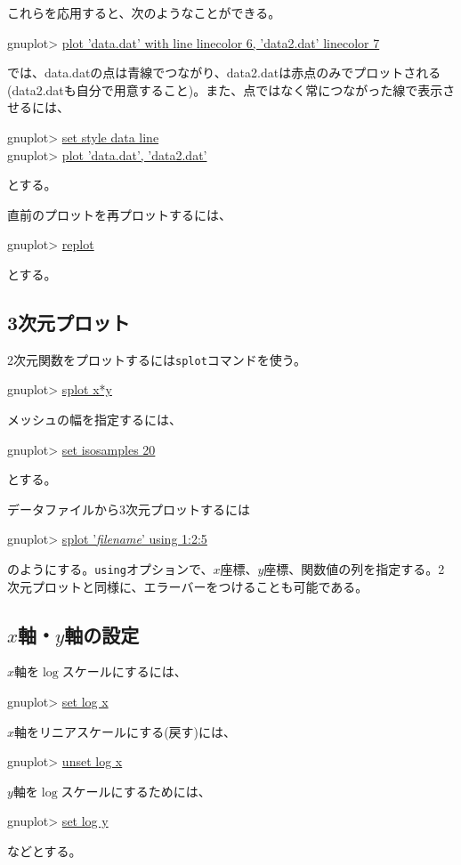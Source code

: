 これらを応用すると、次のようなことができる。
\begin{commandline2}
gnuplot> \underline{plot 'data.dat' with line linecolor 6, 'data2.dat' linecolor 7}
\end{commandline2} \noindent
では、data.datの点は青線でつながり、data2.datは赤点のみでプロットされる(data2.datも自分で用意すること)。また、点ではなく常につながった線で表示させるには、
\begin{commandline2}
gnuplot> \underline{set style data line}\\
gnuplot> \underline{plot 'data.dat', 'data2.dat'}
\end{commandline2} \noindent
とする。

直前のプロットを再プロットするには、
\begin{commandline2}
gnuplot> \underline{replot}
\end{commandline2} \noindent
とする。

\subsection{3次元プロット}

2次元関数をプロットするには{\tt splot}コマンドを使う。
\begin{commandline2}
gnuplot> \underline{splot x*y}
\end{commandline2} \noindent
メッシュの幅を指定するには、
\begin{commandline2}
gnuplot> \underline{set isosamples 20}
\end{commandline2} \noindent
とする。

データファイルから3次元プロットするには
\begin{commandline2}
gnuplot> \underline{splot '{\it filename}' using 1:2:5}
\end{commandline2} \noindent
のようにする。{\tt using}オプションで、$x$座標、$y$座標、関数値の列を指定する。2次元プロットと同様に、エラーバーをつけることも可能である。

\subsection{$x$軸・$y$軸の設定}

$x$軸を$\log$スケールにするには、
\begin{commandline2}
gnuplot> \underline{set log x}
\end{commandline2} \noindent
$x$軸をリニアスケールにする(戻す)には、
\begin{commandline2}
gnuplot> \underline{unset log x}
\end{commandline2} \noindent
$y$軸を$\log$スケールにするためには、
\begin{commandline2}
gnuplot> \underline{set log y}
\end{commandline2} \noindent
などとする。

